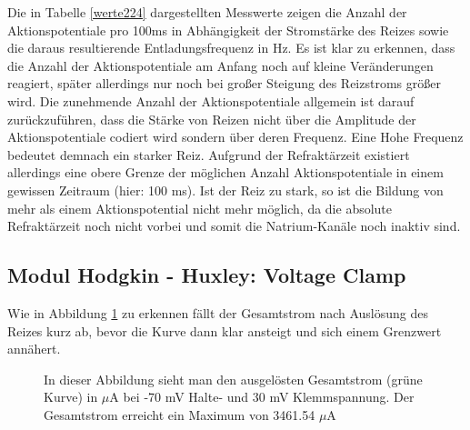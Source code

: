 \documentclass[11pt]{article}
\begin{document}
Die in Tabelle \ref{werte224} dargestellten Messwerte zeigen die Anzahl der Aktionspotentiale pro 100ms in Abhängigkeit der Stromstärke des Reizes sowie die daraus resultierende Entladungsfrequenz in Hz. Es ist klar zu erkennen, dass die Anzahl der Aktionspotentiale am Anfang noch auf kleine Veränderungen reagiert, später allerdings nur noch bei großer Steigung des Reizstroms größer wird. Die zunehmende Anzahl der Aktionspotentiale allgemein ist darauf zurückzuführen, dass die Stärke von Reizen nicht über die Amplitude der Aktionspotentiale codiert wird sondern über deren Frequenz. Eine Hohe Frequenz bedeutet demnach ein starker Reiz. Aufgrund der Refraktärzeit existiert allerdings eine obere Grenze der möglichen Anzahl Aktionspotentiale in einem gewissen Zeitraum (hier: 100 ms).  Ist der Reiz zu stark, so ist die Bildung von mehr als einem Aktionspotential nicht mehr möglich, da die absolute Refraktärzeit noch nicht vorbei und somit die Natrium-Kanäle noch inaktiv sind.

\subsection{Modul Hodgkin - Huxley: Voltage Clamp}

Wie in Abbildung \ref{graph32} zu erkennen fällt der Gesamtstrom nach Auslösung des Reizes kurz ab, bevor die Kurve dann klar  ansteigt und sich einem Grenzwert annähert. 

\begin{figure}[H]
\caption{In dieser Abbildung sieht man den ausgelösten Gesamtstrom (grüne Kurve) in $\mu$A bei -70 mV Halte- und 30 mV Klemmspannung. Der Gesamtstrom erreicht ein Maximum von 3461.54 $\mu$A}
\label{graph32}
\end{figure}
\end{document}
